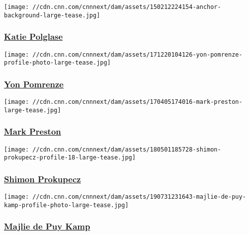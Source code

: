 \href{/profiles/katie-polglase}{}

\texttt{[image: //cdn.cnn.com/cnnnext/dam/assets/150212224154-anchor-background-large-tease.jpg]}

\hypertarget{katie-polglase}{%
\subsubsection{\texorpdfstring{\href{/profiles/katie-polglase}{Katie
Polglase}}{Katie Polglase}}\label{katie-polglase}}

\href{/profiles/yon-pomrenze}{}

\texttt{[image: //cdn.cnn.com/cnnnext/dam/assets/171220104126-yon-pomrenze-profile-photo-large-tease.jpg]}

\hypertarget{yon-pomrenze}{%
\subsubsection{\texorpdfstring{\href{/profiles/yon-pomrenze}{Yon
Pomrenze}}{Yon Pomrenze}}\label{yon-pomrenze}}

\href{/profiles/mark-preston-profile}{}

\texttt{[image: //cdn.cnn.com/cnnnext/dam/assets/170405174016-mark-preston-large-tease.jpg]}

\hypertarget{mark-preston}{%
\subsubsection{\texorpdfstring{\href{/profiles/mark-preston-profile}{Mark
Preston}}{Mark Preston}}\label{mark-preston}}

\href{/profiles/shimon-prokupecz-profile}{}

\texttt{[image: //cdn.cnn.com/cnnnext/dam/assets/180501185728-shimon-prokupecz-profile-18-large-tease.jpg]}

\hypertarget{shimon-prokupecz}{%
\subsubsection{\texorpdfstring{\href{/profiles/shimon-prokupecz-profile}{Shimon
Prokupecz}}{Shimon Prokupecz}}\label{shimon-prokupecz}}

\href{/profiles/majlie-de-puy-kamp}{}

\texttt{[image: //cdn.cnn.com/cnnnext/dam/assets/190731231643-majlie-de-puy-kamp-profile-photo-large-tease.jpg]}

\hypertarget{majlie-de-puy-kamp}{%
\subsubsection{\texorpdfstring{\href{/profiles/majlie-de-puy-kamp}{Majlie
de Puy Kamp}}{Majlie de Puy Kamp}}\label{majlie-de-puy-kamp}}

